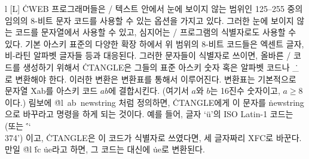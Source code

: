\@{l} [L] \.{CWEB} 프로그래머들은 \TEX/ 텍스트 안에서 눈에 보이지 않는
범위인 125--255 중의 임의의 8-비트 문자 코드를 사용할 수 있는 옵션을
가지고 있다. 그러한 눈에 보이지 않는 코드를 문자열에서 사용할 수 있고,
심지어는 \CEE/ 프로그램의 식별자로도 사용할 수 있다. 기본 아스키 표준의
다양한 확장 하에서 위 범위의 8-비트 코드들은 엑센트 글자, 비-라틴 알파벳
글자들 등과 대응된다. 그러한 문자들이
식별자로 쓰이면, 올바른 \CEE/ 코드를 생성하기 위해서 \.{CTANGLE}은
그들의 표준 아스키 숫자 혹은 알파벳 코드나 \.{\_}로 변환해야 한다. 이러한
변환은 변환표를 통해서 이루어진다. 변환표는
기본적으로 문자열 \.{Xab}를 아스키 코드 \T{\^}$ab$에
결합시킨다. (여기서 $a$와 $b$는 16진수 숫자이고, $a\ge8$이다.) 
림보에 \.{@l\ ab\ newstring} 처럼 정의하면, \.{CTANGLE}에게 이
문자를 \.{newstring}으로 바꾸라고 명령을 하게 되는 것이다. 예를 들어, 
글자 `\"u'의 ISO Latin-1 코드는  (또는 \.{'\char`\\374'})
이고, \.{CTANGLE}은 이 코드가 식별자로 쓰였다면, 세 글자짜리 \.{XFC}로
바꾼다. 만일 \.{@l} \.{fc} \.{ue}라고 하면, 그 코드는 대신에 \.{ue}로
변환된다. 

